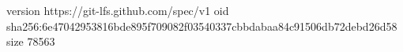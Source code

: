 version https://git-lfs.github.com/spec/v1
oid sha256:6e47042953816bde895f709082f03540337cbbdabaa84c91506db72debd26d58
size 78563
